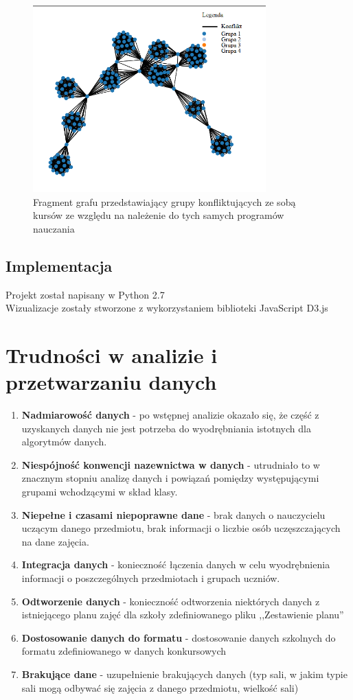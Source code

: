 \begin{figure}[h]
  \centering
   \caption{Fragment grafu przedstawiający grupy konfliktujących ze sobą kursów ze względu na należenie do tych samych programów nauczania}
   \includegraphics[width=0.8\textwidth]{fragmentszkola.PNG}
 
\end{figure}

\subsection{Implementacja}
Projekt został napisany w Python 2.7 \\
Wizualizacje zostały stworzone z wykorzystaniem biblioteki JavaScript D3.js 
\cite{wiz}
\section{Trudności w analizie i przetwarzaniu danych}
\begin{enumerate}
\item \textbf{Nadmiarowość danych} - po wstępnej analizie okazało się, że część z uzyskanych danych nie jest potrzeba do wyodrębniania istotnych dla algorytmów danych.
\item \textbf{Niespójność konwencji nazewnictwa w danych} - utrudniało to w znacznym stopniu analizę danych i powiązań pomiędzy występującymi grupami wchodzącymi w skład klasy.
\item \textbf{Niepełne i czasami niepoprawne dane} - brak danych o nauczycielu uczącym danego przedmiotu, brak informacji o liczbie osób uczęszczających na dane zajęcia.
\item \textbf{Integracja danych} - konieczność łączenia danych w celu wyodrębnienia informacji o poszczególnych przedmiotach i grupach uczniów.
\item \textbf{Odtworzenie danych} - konieczność odtworzenia niektórych danych z istniejącego planu zajęć dla szkoły zdefiniowanego pliku ,,Zestawienie planu''
\item \textbf{Dostosowanie danych do formatu} - dostosowanie danych szkolnych do formatu zdefiniowanego w danych konkursowych
\item \textbf{Brakujące dane} - uzupełnienie brakujących danych (typ sali, w jakim typie sali mogą odbywać się zajęcia z danego przedmiotu, wielkość sali)
\end{enumerate}


